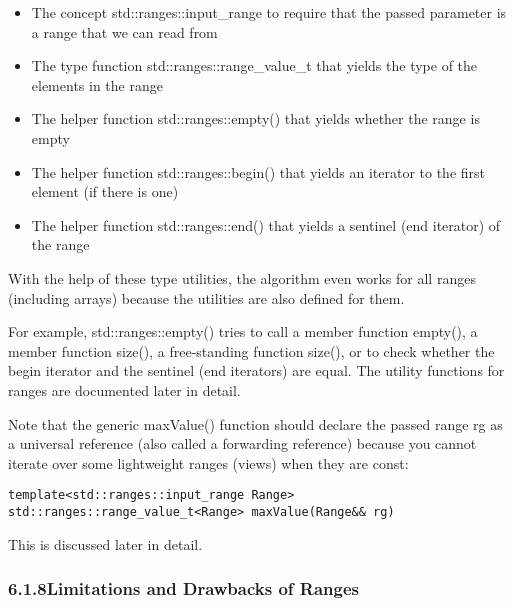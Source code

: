 \begin{itemize}
\item
The concept std::ranges::input\_range to require that the passed parameter is a range that we can read from

\item
The type function std::ranges::range\_value\_t that yields the type of the elements in the range

\item
The helper function std::ranges::empty() that yields whether the range is empty

\item
The helper function std::ranges::begin() that yields an iterator to the first element (if there is one)

\item
The helper function std::ranges::end() that yields a sentinel (end iterator) of the range
\end{itemize}

With the help of these type utilities, the algorithm even works for all ranges (including arrays) because the utilities are also defined for them.

For example, std::ranges::empty() tries to call a member function empty(), a member function size(), a free-standing function size(), or to check whether the begin iterator and the sentinel (end iterators) are equal. The utility functions for ranges are documented later in detail.

Note that the generic maxValue() function should declare the passed range rg as a universal reference (also called a forwarding reference) because you cannot iterate over some lightweight ranges (views) when they are const:

\begin{lstlisting}[style=styleCXX]
template<std::ranges::input_range Range>
std::ranges::range_value_t<Range> maxValue(Range&& rg)
\end{lstlisting}

This is discussed later in detail.

\subsubsection*{ 6.1.8\hspace{0.2cm}Limitations and Drawbacks of Ranges}

